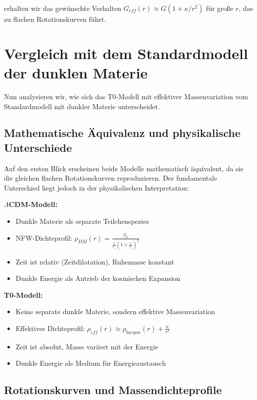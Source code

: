\documentclass[a4paper,12pt]{article}
\begin{document}
erhalten wir das gewünschte Verhalten $G_{eff}(r) \approx G(1 + \kappa/r^2)$ für große $r$, das zu flachen Rotationskurven führt.

\section{Vergleich mit dem Standardmodell der dunklen Materie}

Nun analysieren wir, wie sich das T0-Modell mit effektiver Massenvariation vom Standardmodell mit dunkler Materie unterscheidet.

\subsection{Mathematische Äquivalenz und physikalische Unterschiede}

Auf den ersten Blick erscheinen beide Modelle mathematisch äquivalent, da sie die gleichen flachen Rotationskurven reproduzieren. Der fundamentale Unterschied liegt jedoch in der physikalischen Interpretation:

\begin{tcolorbox}[colback=green!5!white,colframe=green!75!black,title=Vergleich der Modelle]
	\textbf{$\Lambda$CDM-Modell:}
	\begin{itemize}
		\item Dunkle Materie als separate Teilchenspezies
		\item NFW-Dichteprofil: $\rho_{DM}(r) = \frac{\rho_0}{\frac{r}{r_s}(1 + \frac{r}{r_s})^2}$
		\item Zeit ist relativ (Zeitdilatation), Ruhemasse konstant
		\item Dunkle Energie als Antrieb der kosmischen Expansion
	\end{itemize}
	
	\textbf{T0-Modell:}
	\begin{itemize}
		\item Keine separate dunkle Materie, sondern effektive Massenvariation
		\item Effektives Dichteprofil: $\rho_{eff}(r) \approx \rho_{baryon}(r) + \frac{\kappa}{r^2}$
		\item Zeit ist absolut, Masse variiert mit der Energie
		\item Dunkle Energie als Medium für Energieaustausch
	\end{itemize}
\end{tcolorbox}

\subsection{Rotationskurven und Massendichteprofile}
\end{document}
